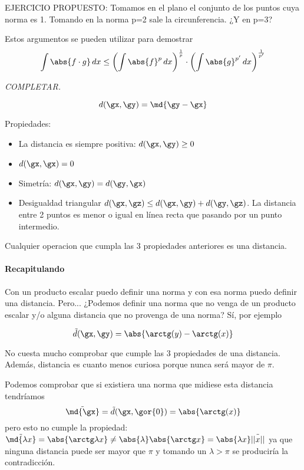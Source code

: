 \documentclass[a4paper,10pt]{apuntes}
\begin{document}
EJERCICIO PROPUESTO: Tomamos en el plano el conjunto de los puntos cuya norma es 1. Tomando en la norma p=2 sale la circunferencia. ¿Y en p=3? 


\begin{remark} Estos argumentos se pueden utilizar para demostrar
\[ \int \abs{f\cdot g}\, dx \leq \left(\int\abs{f}^p\, dx\right) ^ \frac{1}{p} \cdot \left(\int\abs{g}^{p'}\,dx\right)^\frac{1}{p'} \]

\textit{COMPLETAR.}
\end{remark}

\begin{defn}
\[d(\gx,\gy) = \md{\gy - \gx} \]
\end{defn}

Propiedades:
\begin{itemize}
 \item La distancia es siempre positiva: $d(\gx,\gy)\ge 0$
 \item $d(\gx,\gx) = 0$
 \item Simetría: $d(\gx,\gy) = d(\gy, \gx)$
 \item Desigualdad triangular $d(\gx,\gz) \leq d(\gx,\gy) + d(\gy,\gz)$. La distancia entre 2 puntos es menor o igual en línea recta que pasando por un punto intermedio.
\end{itemize}


\begin{defn}[Distancia] Cualquier operacion que cumpla las 3 propiedades anteriores es una distancia. \end{defn}

\paragraph{Recapitulando}
Con un producto escalar puedo definir una norma y con esa norma puedo definir una distancia. Pero... ¿Podemos definir una norma 
que no venga de un producto escalar y/o alguna distancia que no provenga de una norma? Sí, por ejemplo

\[ \tilde{d} (\gx,\gy) = \abs{\arctg(y) - \arctg(x)} \] 

No cuesta mucho comprobar que cumple las 3 propiedades de una distancia. Además, distancia es cuanto menos curiosa porque nunca será mayor de $\pi$.

 Podemos comprobar que si existiera una norma que midiese esta distancia tendríamos \[\tilde{\md{\gx}} = \tilde{d} (\gx,\gor{0}) = \abs{\arctg (x)} \]
 pero esto no cumple la propiedad: $\tilde{\md{\lambda x}} = \abs{\arctg \lambda x} \neq \abs{\lambda}\abs{\arctg x} = 
 \abs{\lambda x}\tilde{||x||}$
 ya que ninguna distancia puede ser mayor que $\pi$ y tomando un $\lambda > \pi$ se produciría la contradicción.
\end{document}
